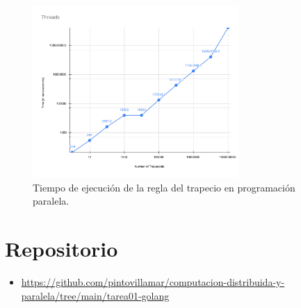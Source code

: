 \documentclass[a4paper]{article}
\begin{document}
\begin{figure}[H]
\centering
\includegraphics[width=0.7\textwidth]{Threads.pdf}
\caption{Tiempo de ejecución de la regla del trapecio en programación paralela.}
\end{figure}

\pagebreak

\section{Repositorio}
\begin{itemize}
\item \href{https://github.com/pintovillamar/computacion-distribuida-y-paralela/tree/main/tarea01-golang}{https://github.com/pintovillamar/computacion-distribuida-y-paralela/tree/main/tarea01-golang}
\end{itemize}




\end{document}
